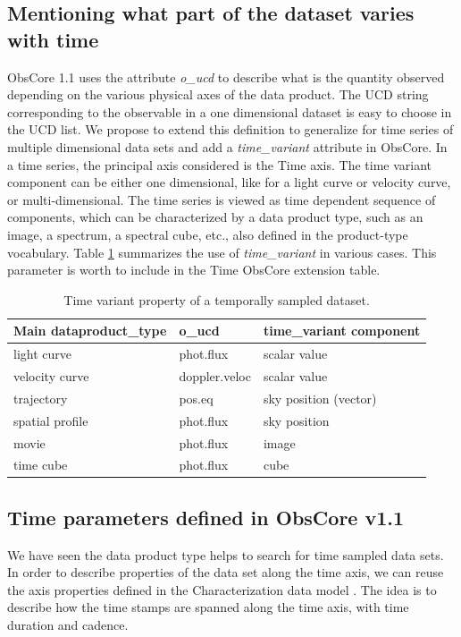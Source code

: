 \documentclass[11pt,a4paper]{ivoa}
\begin{document}
\subsection{Mentioning what part of the dataset varies with time }
\label{sec:timevariant}
ObsCore 1.1 uses the attribute \emph{o\_ucd} to describe what is the quantity observed depending on the various physical axes of the data product. The  UCD string corresponding to the observable in  a one dimensional dataset is  easy to choose in the UCD list.  We propose to extend this definition to generalize for time series of multiple dimensional data sets and add a \emph{time\_variant} attribute in ObsCore.
In a time series, the principal axis considered is the Time axis. The time variant component can be either one dimensional, like for a light curve or velocity curve, or multi-dimensional. The time series is viewed as  time dependent sequence of components, which can be characterized  by a data product type, such as an image, a spectrum, a spectral cube, etc., also  defined in the product-type vocabulary. Table \ref{tab:timevar} summarizes the use of \emph{ time\_variant}  in various cases.
This parameter is worth to include in the Time ObsCore extension table.

\begin{table}[!htb]
   \begin{center}
  \caption{Time variant property of a temporally sampled dataset.  \label{tab:timevar} }

  \begin{small}
  \begin{tabular}{|l|l|l|}
\sptablerule
\textbf{Main dataproduct\_type} & \textbf{o\_ucd}  &\textbf{time\_variant component }   \\ \hline
light curve & phot.flux &  scalar value \\ \hline
velocity curve & doppler.veloc & scalar value \\ \hline
trajectory & pos.eq  &  sky position (vector) \\ \hline
spatial profile&  phot.flux & sky position \\ \hline
movie & phot.flux & image \\ \hline
time cube & phot.flux & cube \\ \hline
 \end{tabular}
  \end{small}
  \end{center}
 \end{table}

 \subsection{Time parameters defined in ObsCore v1.1}
 \label{sec:alreadythere}
 We have seen the data product type helps to search for time sampled data sets.
 In order to describe properties of the data set along the time axis, we can reuse the axis properties defined in the Characterization data model \cite{2008ivoa.spec.0325L}.
 The idea is to describe how the time stamps are spanned along the time axis, with time duration and  cadence.
\end{document}
